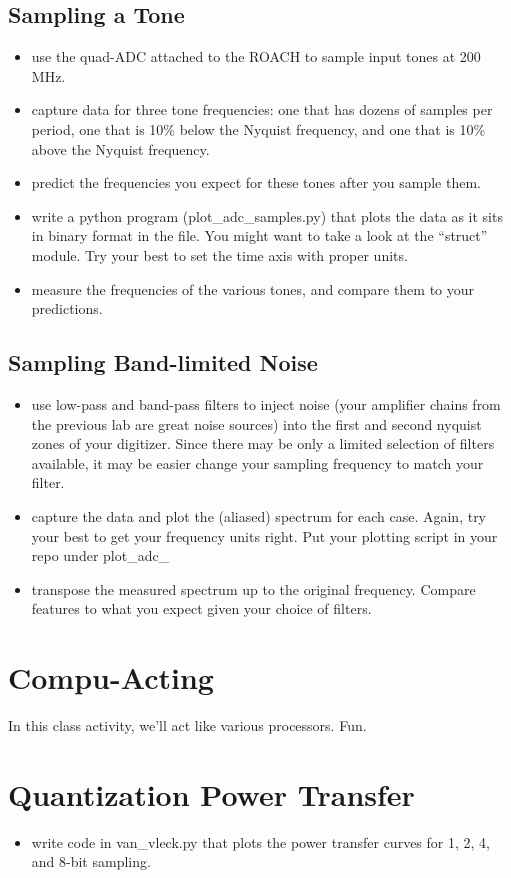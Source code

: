 \documentclass[11pt]{article}
\begin{document}
\subsection{Sampling a Tone}
\begin{itemize}
\item use the quad-ADC attached to the ROACH to sample input tones at 200 MHz.
\item capture data for three tone
frequencies: one that has dozens of samples per period, one that is 10\% below the Nyquist frequency,
and one that is 10\% above the Nyquist frequency.
\item predict the frequencies you expect for these tones after you sample them.
\item write a python program (plot\_adc\_samples.py) that plots the data as it sits in binary format
in the file.  You might want to take a look at the ``struct'' module.  Try your best to set the time
axis with proper units.
\item measure the frequencies of the various tones, and compare them to your predictions.
\end{itemize}

\subsection{Sampling Band-limited Noise}
\begin{itemize}
\item use low-pass and band-pass filters to inject noise (your amplifier chains from the previous
lab are great noise sources) into the first and second nyquist zones of your digitizer.  Since there
may be only a limited selection of filters available, it may be easier change your sampling
frequency to match your filter.
\item capture the data and plot the (aliased) spectrum for each case.  Again, try your best to get your
frequency units right.  Put your plotting script in your repo under plot\_adc\_
\item transpose the measured spectrum up to the original frequency.  Compare features to what you expect
given your choice of filters.
\end{itemize}

\section{Compu-Acting}

In this class activity, we'll act like various processors.  Fun.

\section{Quantization Power Transfer}

\begin{itemize}
\item write code in van\_vleck.py that plots the power transfer curves for 1, 2, 4, and 8-bit sampling.
\end{itemize}
\end{document}
